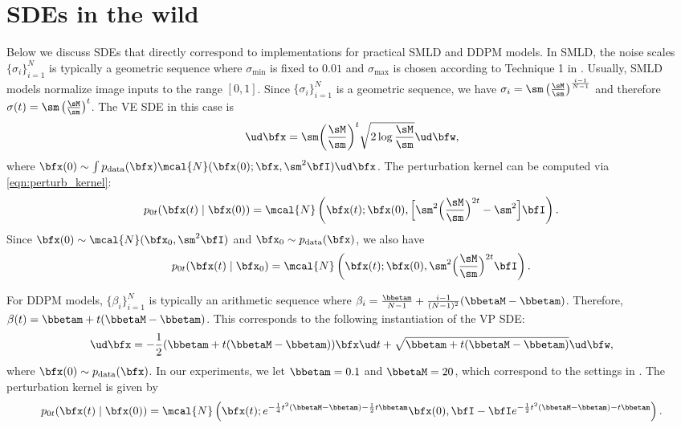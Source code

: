 \section{SDEs in the wild} \label{app:wild_sde}
Below we discuss SDEs that directly correspond to implementations for practical SMLD and DDPM models. In SMLD, the noise scales $\{\sigma_i\}_{i=1}^N$ is typically a geometric sequence where $\sigma_\text{min}$ is fixed to $0.01$ and $\sigma_\text{max}$ is chosen according to Technique 1 in \citet{song2020improved}. Usually, SMLD models normalize image inputs to the range $[0, 1]$. Since $\{\sigma_i\}_{i=1}^N$ is a geometric sequence, we have $\sigma_i = \sm \left(\frac{\sM}{\sm}\right)^{\frac{i-1}{N-1}}$ and therefore $\sigma(t) = \sm \left(\frac{\sM}{\sm}\right)^{t}$. The VE SDE in this case is
\begin{align}
\ud \bfx = \sm \bigg( \frac{\sM}{\sm} \bigg)^t \sqrt{2 \log \frac{\sM}{\sm}}\ud \bfw,
\end{align}
where $\bfx(0) \sim \int p_\text{data}(\bfx) \mcal{N}(\bfx(0); \bfx, \sm^2 \bfI) \ud \bfx$. The perturbation kernel can be computed via \cref{eqn:perturb_kernel}:
\begin{align}
    p_{0t}(\bfx(t) \mid \bfx(0)) = \mcal{N}\left(\bfx(t) ; \bfx(0), \Big[\sm^2 \Big( \frac{\sM}{\sm}\Big)^{2t} - \sm^2\Big] \bfI\right).
\end{align}
Since $\bfx(0) \sim \mcal{N}(\bfx_0, \sm^2 \bfI)$ and $\bfx_0 \sim p_\text{data}(\bfx)$, we also have
\begin{align*}
    p_{0t}(\bfx(t) \mid \bfx_0) = \mcal{N}\left(\bfx(t) ; \bfx(0), \sm^2 \Big( \frac{\sM}{\sm}\Big)^{2t} \bfI\right).
\end{align*}

For DDPM models, $\{\beta_i\}_{i=1}^N$ is typically an arithmetic sequence where $\beta_i = \frac{\bbetam}{N-1} + \frac{i-1}{(N-1)^2}(\bbetaM -\bbetam)$. Therefore, $\beta(t) = \bbetam + t(\bbetaM - \bbetam)$. This corresponds to the following instantiation of the VP SDE:
\begin{gather}
\ud \bfx = -\frac{1}{2}(\bbetam + t(\bbetaM - \bbetam)) \bfx \ud t + \sqrt{\bbetam + t(\bbetaM - \bbetam)} \ud \bfw,
\end{gather}
where $\bfx(0) \sim p_\text{data}(\bfx)$. In our experiments, we let $\bbetam = 0.1$ and $\bbetaM = 20$, which correspond to the settings in \citet{ho2020denoising}. The perturbation kernel is given by
\begin{align}
    p_{0t}(\bfx(t) \mid \bfx(0)) = \mcal{N}\left(\bfx(t) ; e^{-\frac{1}{4}t^2(\bbetaM-\bbetam) - \frac{1}{2}t\bbetam}\bfx(0), \bfI - \bfI e^{-\frac{1}{2}t^2(\bbetaM -\bbetam) - t\bbetam} \right).
\end{align}

